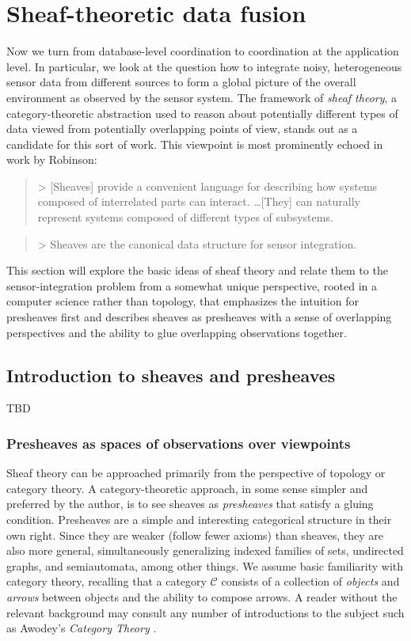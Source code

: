 \section{Sheaf-theoretic data fusion}


Now we turn from database-level coordination to coordination at the application level. In particular, we look at the question how to integrate noisy, heterogeneous sensor data from different sources to form a global picture of the overall environment as observed by the sensor system. The framework of \emph{sheaf theory}, a category-theoretic abstraction used to reason about potentially different types of data viewed from potentially overlapping points of view, stands out as a candidate for this sort of work. This viewpoint is most prominently echoed in work by Robinson:
\begin{quote}
>   [Sheaves] provide a convenient language for describing how systems composed of interrelated parts can interact. \ldots [They] can naturally represent systems composed of different types of subsystems. \cite{2020robinsonPseudometric}
\end{quote}
\begin{quote}
>   Sheaves are the canonical data structure for sensor integration. \cite{2017robinsonCanonical}
\end{quote}
This section will explore the basic ideas of sheaf theory and relate them to the sensor-integration problem from a somewhat unique perspective, rooted in a computer science rather than topology, that emphasizes the intuition for presheaves first and describes sheaves as presheaves with a sense of overlapping perspectives and the ability to glue overlapping observations together.

\subsection{Introduction to sheaves and presheaves} 

TBD

\subsubsection{Presheaves as spaces of observations over viewpoints}

Sheaf theory can be approached primarily from the perspective of topology or category theory. A category-theoretic approach, in some sense simpler and preferred by the author, is to see sheaves as \emph{presheaves} that satisfy a gluing condition. Presheaves are a simple and interesting categorical structure in their own right. Since they are weaker (follow fewer axioms) than sheaves, they are also more general, simultaneously generalizing indexed families of sets, undirected graphs, and semiautomata, among other things. We assume basic familiarity with category theory, recalling that a category $\mathcal{C}$ consists of a collection of \emph{objects} and \emph{arrows} between objects and the ability to compose arrows. A reader without the relevant background may consult any number of introductions to the subject such as Awodey's \emph{Category Theory} \cite{10.5555/2060081}.



